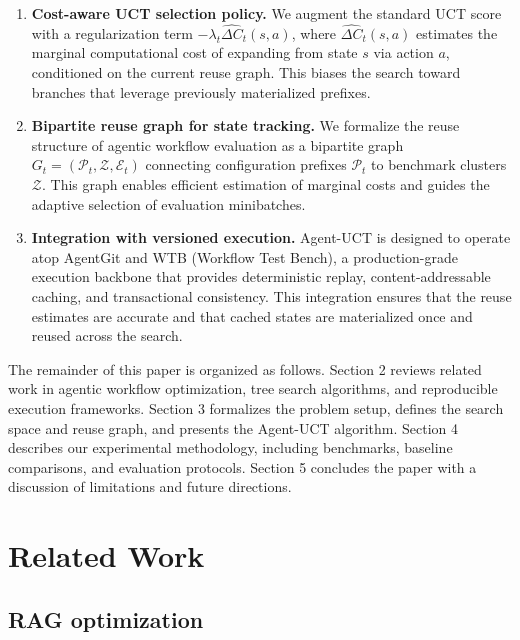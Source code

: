 \documentclass{article}
\begin{document}
\begin{enumerate}
    \item \textbf{Cost-aware UCT selection policy.} We augment the standard UCT score with a regularization term $-\lambda_t \widehat{\Delta C}_t(s,a)$, where $\widehat{\Delta C}_t(s,a)$ estimates the marginal computational cost of expanding from state $s$ via action $a$, conditioned on the current reuse graph. This biases the search toward branches that leverage previously materialized prefixes.
    
    \item \textbf{Bipartite reuse graph for state tracking.} We formalize the reuse structure of agentic workflow evaluation as a bipartite graph $G_t = (\mathcal P_t, \mathcal Z, \mathcal E_t)$ connecting configuration prefixes $\mathcal P_t$ to benchmark clusters $\mathcal Z$. This graph enables efficient estimation of marginal costs and guides the adaptive selection of evaluation minibatches.
    
    \item \textbf{Integration with versioned execution.} Agent-UCT is designed to operate atop AgentGit \citep{li2025agentgit} and WTB (Workflow Test Bench), a production-grade execution backbone that provides deterministic replay, content-addressable caching, and transactional consistency. This integration ensures that the reuse estimates are accurate and that cached states are materialized once and reused across the search.
\end{enumerate}

    The remainder of this paper is organized as follows. Section 2 reviews related work in agentic workflow optimization, tree search algorithms, and reproducible execution frameworks. Section 3 formalizes the problem setup, defines the search space and reuse graph, and presents the Agent-UCT algorithm. Section 4 describes our experimental methodology, including benchmarks, baseline comparisons, and evaluation protocols. Section 5 concludes the paper with a discussion of limitations and future directions.


\section{Related Work}

\subsection{RAG optimization}
\end{document}
